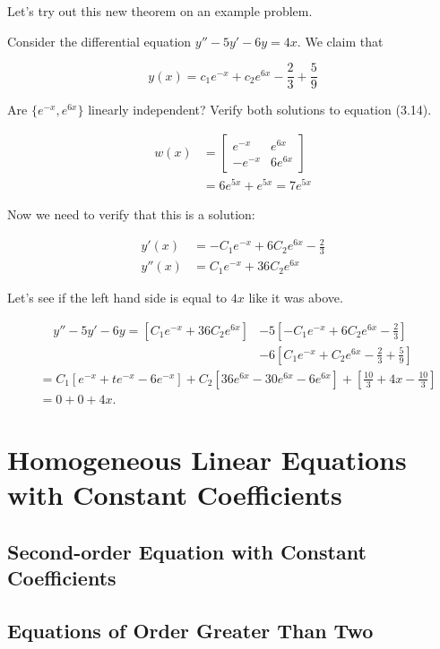   Let's try out this new theorem on an example problem.

  \begin{problem}
    Consider the differential equation $y''-5y'-6y=4x$. We claim that 

    \begin{equation}
      y(x)=c_1e^{-x}+c_2e^{6x}-\frac{2}{3}+\frac{5}{9}
    \end{equation}

    Are $\{e^{-x},e^{6x}\}$ linearly independent? Verify both solutions to equation (3.14).

    \begin{align}
      w(x)&=\begin{bmatrix} e^{-x}&e^{6x}\\-e^{-x}&6e^{6x} \end{bmatrix} \\
          &=6e^{5x}+e^{5x}=7e^{5x}
    \end{align}

    Now we need to verify that this is a solution:

    \begin{align}
      y'(x)&=-C_1e^{-x}+6C_2e^{6x}-\frac{2}{3}\\
      y''(x)&=C_1e^{-x}+36C_2e^{6x}
    \end{align}

     Let's see if the left hand side is equal to $4x$ like it was above.

     \begin{align*}
       y''-5y'-6y=\left[C_1e^{-x}+36C_2e^{6x}\right]&-5\left[-C_1e^{-x}+6C_2e^{6x}-\frac{2}{3}\right]\\
                                                    &-6\left[C_1e^{-x}+C_2e^{6x}-\frac{2}{3}+\frac{5}{9}\right]
     \end{align*}
     \begin{align*}
       &=C_1[e^{-x}+te^{-x}-6e^{-x}]+C_2[36e^{6x}-30e^{6x}-6e^{6x}]+\left[\frac{10}{3}+4x-\frac{10}{3}\right]\\
       &=0+0+4x
     .\end{align*}

  \end{problem}

\section{Homogeneous Linear Equations with Constant Coefficients}

  \subsection{Second-order Equation with Constant Coefficients}

  \subsection{Equations of Order Greater Than Two}
